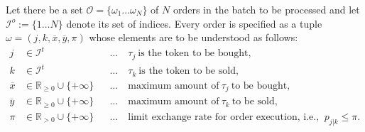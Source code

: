 \documentclass[11pt,parskip=full]{scrartcl}%
\newcommand*{\ie}{i.e., }
\newcommand*{\orders}{\mathcal{O}}          %
\newcommand*{\itokens}{\mathcal{I}^t}       %
\newcommand*{\iorders}{\mathcal{I}^o}       %
\begin{document}
Let there be a set $ \orders = \{ \omega_1 \ldots \omega_N \} $ of $ N $ orders in the batch to be
processed and let $ \iorders := \{ 1 \ldots N \} $ denote its set of indices.
Every order is specified as a tuple $ \omega = (j,k,\overline{x},\overline{y},\pi) $ whose elements
are to be understood as follows:
\begin{align*}
  j &\in \itokens &&
    \ldots \quad \tau_j \> \text{is the token to be bought,}\\
  k &\in \itokens &&
    \ldots \quad \tau_k \> \text{is the token to be sold,}\\
  \overline{x} &\in \mathbb{R}_{\ge 0} \cup \{+\infty\} &&
    \ldots \quad \text{maximum amount of} \> \tau_j \> \text{to be bought,}\\
  \overline{y} &\in \mathbb{R}_{\ge 0} \cup \{+\infty\} &&
    \ldots \quad \text{maximum amount of} \> \tau_k \> \text{to be sold,}\\
  \pi &\in \mathbb{R}_{>0} \cup \{+\infty\} &&
    \ldots \quad \text{limit exchange rate for order execution, \ie} \> p_{j|k} \le \pi.
\end{align*}
\end{document}
